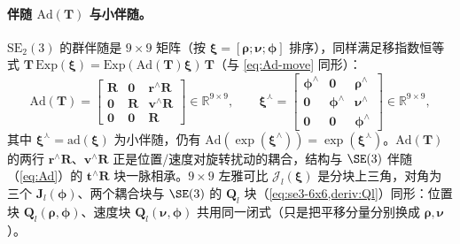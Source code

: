 \paragraph{伴随 $\mathrm{Ad}(\mathbf{T})$ 与小伴随。}
$\mathrm{SE}_2(3)$ 的群伴随是 $9\times9$ 矩阵（按 $\boldsymbol{\xi}=[\boldsymbol{\rho};\boldsymbol{\nu};\boldsymbol{\phi}]$ 排序），同样满足移指数恒等式 $\mathbf{T}\,\mathrm{Exp}(\boldsymbol{\xi})=\mathrm{Exp}(\mathrm{Ad}(\mathbf{T})\boldsymbol{\xi})\,\mathbf{T}$（与 \cref{eq:Ad-move} 同形）：
\begin{equation}
  \mathrm{Ad}(\mathbf{T})=\begin{bmatrix}\mathbf{R}&\mathbf{0}&\mathbf{r}^\wedge\mathbf{R}\\\mathbf{0}&\mathbf{R}&\mathbf{v}^\wedge\mathbf{R}\\\mathbf{0}&\mathbf{0}&\mathbf{R}\end{bmatrix}\in\mathbb{R}^{9\times9},
  \qquad
  \boldsymbol{\xi}^\curlywedge=\begin{bmatrix}\boldsymbol{\phi}^\wedge&\mathbf{0}&\boldsymbol{\rho}^\wedge\\\mathbf{0}&\boldsymbol{\phi}^\wedge&\boldsymbol{\nu}^\wedge\\\mathbf{0}&\mathbf{0}&\boldsymbol{\phi}^\wedge\end{bmatrix}\in\mathbb{R}^{9\times9},
  \label{eq:se23-adjoint}
\end{equation}
其中 $\boldsymbol{\xi}^\curlywedge=\mathrm{ad}(\boldsymbol{\xi})$ 为小伴随，仍有 $\mathrm{Ad}(\exp(\boldsymbol{\xi}^\wedge))=\exp(\boldsymbol{\xi}^\curlywedge)$。$\mathrm{Ad}(\mathbf{T})$ 的两行 $\mathbf{r}^\wedge\mathbf{R}$、$\mathbf{v}^\wedge\mathbf{R}$ 正是位置/速度对旋转扰动的耦合，结构与 $\SE(3)$ 伴随（\cref{eq:Ad}）的 $\mathbf{t}^\wedge\mathbf{R}$ 块一脉相承。$9\times9$ 左雅可比 $\boldsymbol{\mathcal{J}}_l(\boldsymbol{\xi})$ 是分块上三角，对角为三个 $\mathbf{J}_l(\boldsymbol{\phi})$、两个耦合块与 $\SE(3)$ 的 $\mathbf{Q}_l$ 块（\cref{eq:se3-6x6,deriv:Ql}）同形：位置块 $\mathbf{Q}_l(\boldsymbol{\rho},\boldsymbol{\phi})$、速度块 $\mathbf{Q}_l(\boldsymbol{\nu},\boldsymbol{\phi})$ 共用同一闭式（只是把平移分量分别换成 $\boldsymbol{\rho},\boldsymbol{\nu}$）。

